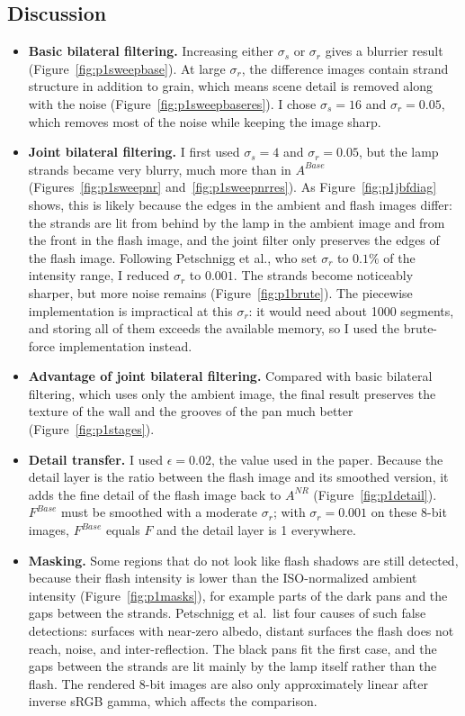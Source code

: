 \documentclass[11pt]{article}
\begin{document}
\subsection*{Discussion}
\begin{itemize}\setlength{\itemsep}{2pt}
\item \textbf{Basic bilateral filtering.} Increasing either $\sigma_s$ or $\sigma_r$ gives a blurrier result (Figure~\ref{fig:p1sweepbase}). At large $\sigma_r$, the difference images contain strand structure in addition to grain, which means scene detail is removed along with the noise (Figure~\ref{fig:p1sweepbaseres}). I chose $\sigma_s=16$ and $\sigma_r=0.05$, which removes most of the noise while keeping the image sharp.

\item \textbf{Joint bilateral filtering.} I first used $\sigma_s=4$ and $\sigma_r=0.05$, but the lamp strands became very blurry, much more than in $A^{Base}$ (Figures~\ref{fig:p1sweepnr} and~\ref{fig:p1sweepnrres}). As Figure~\ref{fig:p1jbfdiag} shows, this is likely because the edges in the ambient and flash images differ: the strands are lit from behind by the lamp in the ambient image and from the front in the flash image, and the joint filter only preserves the edges of the flash image. Following Petschnigg et al., who set $\sigma_r$ to $0.1\%$ of the intensity range, I reduced $\sigma_r$ to $0.001$. The strands become noticeably sharper, but more noise remains (Figure~\ref{fig:p1brute}). The piecewise implementation is impractical at this $\sigma_r$: it would need about 1000 segments, and storing all of them exceeds the available memory, so I used the brute-force implementation instead.

\item \textbf{Advantage of joint bilateral filtering.} Compared with basic bilateral filtering, which uses only the ambient image, the final result preserves the texture of the wall and the grooves of the pan much better (Figure~\ref{fig:p1stages}).

\item \textbf{Detail transfer.} I used $\epsilon=0.02$, the value used in the paper. Because the detail layer is the ratio between the flash image and its smoothed version, it adds the fine detail of the flash image back to $A^{NR}$ (Figure~\ref{fig:p1detail}). $F^{Base}$ must be smoothed with a moderate $\sigma_r$; with $\sigma_r=0.001$ on these 8-bit images, $F^{Base}$ equals $F$ and the detail layer is 1 everywhere.

\item \textbf{Masking.} Some regions that do not look like flash shadows are still detected, because their flash intensity is lower than the ISO-normalized ambient intensity (Figure~\ref{fig:p1masks}), for example parts of the dark pans and the gaps between the strands. Petschnigg et al.\ list four causes of such false detections: surfaces with near-zero albedo, distant surfaces the flash does not reach, noise, and inter-reflection. The black pans fit the first case, and the gaps between the strands are lit mainly by the lamp itself rather than the flash. The rendered 8-bit images are also only approximately linear after inverse sRGB gamma, which affects the comparison.


\end{itemize}
\end{document}

